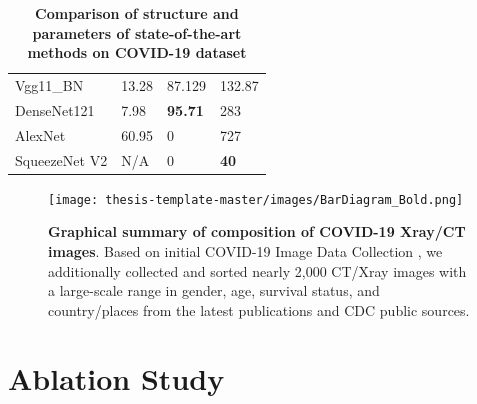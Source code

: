 \begin{table}[h]
\begin{tabular}{@{}llll@{}}
Vgg11\_BN  \cite{23}   & 13.28                                                                           & 87.129                                                                            & 132.87                                                                        \\
DenseNet121  \cite{32} & 7.98                                                                            & {\color[HTML]{CB0000} \textbf{95.71}}                                             & 283                                                                           \\
AlexNet   \cite{31}    & 60.95                                                                           & 0                                                                                 & 727                                                                           \\
SqueezeNet V2 \cite{24} & {\color[HTML]{000000} N/A}                                                      & 0                                                                                 & {\color[HTML]{CB0000} \textbf{40}}                                            \\ \bottomrule
\end{tabular}
\caption{\textbf{Comparison of structure and parameters of state-of-the-art methods on COVID-19 dataset}}

\end{table}

\begin{figure}[b]
\texttt{[image: thesis-template-master/images/BarDiagram\_Bold.png]}
\label{fig}
\centering
\caption{\textbf{Graphical summary of composition of COVID-19 Xray/CT images}. Based on initial COVID-19 Image Data Collection \cite{37}, we additionally collected and sorted nearly 2,000 CT/Xray images with a large-scale range in gender, age, survival status, and country/places from the latest publications and CDC public sources\cite{36}\cite{37}\cite{38}. }
\label{fig:4.17}
\end{figure}


\chapter{Ablation Study}
\label{sec:examples}

